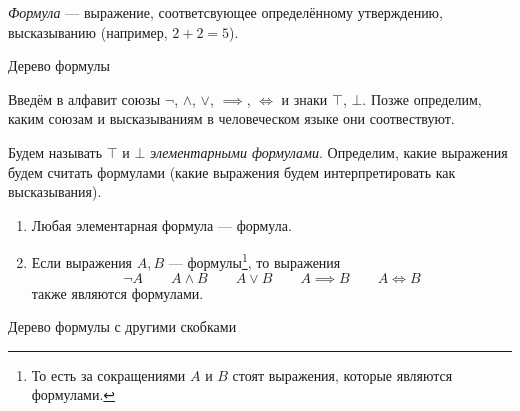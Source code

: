   {\it Формула} --- выражение,
соответсвующее определённому утверждению, высказыванию
(например, $2+2=5$). 
\begin{marginfigure}[3.5cm]
  \centering

  \caption{Дерево формулы}\label{fig:form_tree}
\end{marginfigure}

Введём в алфавит союзы $\lnot$, $\land$, $\lor$, $\implies$, $\iff$
и знаки $\top$, $\bot$.
Позже определим, каким союзам и высказываниям в человеческом
языке они соотвествуют.

Будем называть $\top$ и $\bot$ {\it элементарными формулами}.
Определим, какие выражения будем считать формулами (какие выражения 
будем интерпретировать как высказывания).
\begin{enumerate}
  \item{}Любая элементарная формула --- формула.

  \item{}Если выражения $A,B$ --- формулы\footnote{То есть за 
      сокращениями $A$ и $B$ стоят выражения, которые являются 
      формулами.}, то выражения
  \begin{equation}\label{eq:comp_formulas}
    \lnot A\qquad A\land B\qquad A\lor B\qquad A\implies B\qquad A\iff B
  \end{equation}
  также являются формулами.
\end{enumerate}

\begin{marginfigure}[0.75cm]
  \centering

  \caption{Дерево формулы с другими скобками}\label{fig:form_tree_2}
\end{marginfigure}

